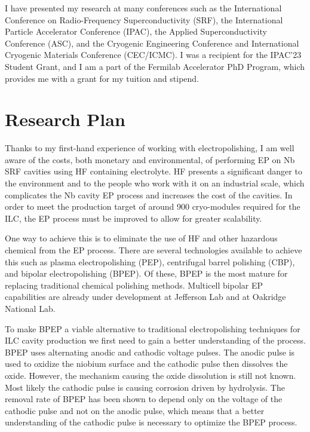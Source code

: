 \documentclass[]{revtex4-2}
\begin{document}
    I have presented my research at many conferences such as the International Conference on Radio-Frequency Superconductivity (SRF), the International Particle Accelerator Conference (IPAC), the Applied Superconductivity Conference (ASC), and the Cryogenic Engineering Conference and International Cryogenic Materials Conference (CEC/ICMC). I was a recipient for the IPAC'23 Student Grant, and I am a part of the Fermilab Accelerator PhD Program, which provides me with a grant for my tuition and stipend.





\section{Research Plan}

    Thanks to my first-hand experience of working with electropolishing, I am well aware of the costs, both monetary and environmental, of performing EP on Nb SRF cavities using HF containing electrolyte. HF presents a significant danger to the environment and to the people who work with it on an industrial scale, which complicates the Nb cavity EP process and increases the cost of the cavities. In order to meet the production target of around 900 cryo-modules required for the ILC, the EP process must be improved to allow for greater scalability.

    One way to achieve this is to eliminate the use of HF and other hazardous chemical from the EP process. There are several technologies available to achieve this such as plasma electropolishing (PEP), centrifugal barrel polishing (CBP), and bipolar electropolishing (BPEP). Of these, BPEP is the most mature for replacing traditional chemical polishing methods. Multicell bipolar EP capabilities are already under development at Jefferson Lab\cite{tian:srf2019-frcab1} and at Oakridge National Lab\cite{inman2015electropolishing}.
    
    To make BPEP a viable alternative to traditional electropolishing techniques for ILC cavity production we first need to gain a better understanding of the process. BPEP uses alternating anodic and cathodic voltage pulses. The anodic pulse is used to oxidize the niobium surface and the cathodic pulse then dissolves the oxide. However, the mechanism causing the oxide dissolution is still not known. Most likely the cathodic pulse is causing corrosion driven by hydrolysis. The removal rate of BPEP has been shown to depend only on the voltage of the cathodic pulse and not on the anodic pulse, which means that a better understanding of the cathodic pulse is necessary to optimize the BPEP process.
\end{document}
